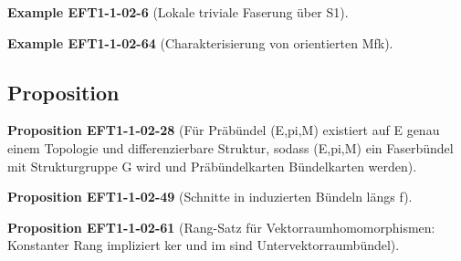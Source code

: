 \documentclass[10pt, letterpaper]{article}
\newcommand{\CustomHeading}[3]{%
  \par\medskip\noindent%
  \textbf{#1 #2} \textnormal{(#3)}.\enskip%
}
\newenvironment{PROP}[2]{\CustomHeading{Proposition}{#1}{#2}}{}
\newenvironment{EXA}[2]{\CustomHeading{Example}{#1}{#2}}{}
\begin{document}
\begin{EXA}{EFT1-1-02-6}{Lokale triviale Faserung über S1}

\end{EXA}

\begin{EXA}{EFT1-1-02-64}{Charakterisierung von orientierten Mfk}

\end{EXA}


















































\subsection{Proposition}

\begin{PROP}{EFT1-1-02-28}{Für Präbündel (E,pi,M) existiert auf E genau einem Topologie und differenzierbare Struktur, sodass (E,pi,M) ein Faserbündel mit Strukturgruppe G wird und Präbündelkarten Bündelkarten werden}

\end{PROP}

\begin{PROP}{EFT1-1-02-49}{Schnitte in induzierten Bündeln längs f}

\end{PROP}

\begin{PROP}{EFT1-1-02-61}{Rang-Satz für Vektorraumhomomorphismen: Konstanter Rang impliziert ker und im sind Untervektorraumbündel}

\end{PROP}
\end{document}
